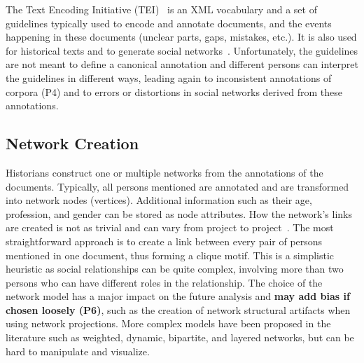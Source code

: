 The Text Encoding Initiative (TEI)~\cite{TEI} is an XML vocabulary and a set of guidelines typically used to encode and annotate documents, and the events happening in these documents (unclear parts, gaps, mistakes, etc.).
It is also used for historical texts and to generate social networks~\cite{dufournaudComparaisonOutilsPour2006, serranomolineroUnderstandingUseVistorian2017}.
Unfortunately, the guidelines are not meant to define a canonical annotation and different persons can interpret the guidelines in different ways, leading again to inconsistent annotations of corpora (P4) and to errors or distortions in social networks derived from these annotations.

\subsection{Network Creation}
Historians construct one or multiple networks from the annotations of the documents.
Typically, all persons mentioned are annotated and are transformed into network nodes (vertices).
Additional information such as their age, profession, and gender can be stored as node attributes.
How the network's links are created is not as trivial and can vary from project to project~\cite{alkadi2022}.
The most straightforward approach is to create a link between every pair of persons mentioned in one document, thus forming a clique motif.
This is a simplistic heuristic as social relationships can be quite complex, involving more than two persons who can have different roles in the relationship.
The choice of the network model has a major impact on the future analysis and \textbf{may add bias if chosen loosely (P6)}, such as the creation of network structural artifacts when using network projections\cite{cristofoliAuxSourcesGrands2008}.
More complex models have been proposed in the literature such as weighted, dynamic, bipartite, and layered networks, but can be hard to manipulate and visualize. %

